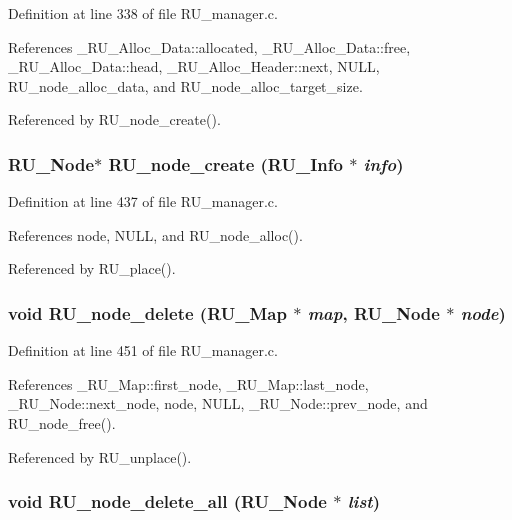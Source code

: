 Definition at line 338 of file RU\_\-manager.c.

References \_\-RU\_\-Alloc\_\-Data::allocated, \_\-RU\_\-Alloc\_\-Data::free, \_\-RU\_\-Alloc\_\-Data::head, \_\-RU\_\-Alloc\_\-Header::next, NULL, RU\_\-node\_\-alloc\_\-data, and RU\_\-node\_\-alloc\_\-target\_\-size.

Referenced by RU\_\-node\_\-create().
\subsubsection{\setlength{\rightskip}{0pt plus 5cm}\bf{RU\_\-Node}$\ast$ RU\_\-node\_\-create (\bf{RU\_\-Info} $\ast$ {\em info})}\label{RU__manager_8c_a315764809eb265c289f574a6e007dea}




Definition at line 437 of file RU\_\-manager.c.

References node, NULL, and RU\_\-node\_\-alloc().

Referenced by RU\_\-place().
\subsubsection{\setlength{\rightskip}{0pt plus 5cm}void RU\_\-node\_\-delete (\bf{RU\_\-Map} $\ast$ {\em map}, \bf{RU\_\-Node} $\ast$ {\em node})}\label{RU__manager_8c_c88c4d3a796e4c8b83832f18e219e084}




Definition at line 451 of file RU\_\-manager.c.

References \_\-RU\_\-Map::first\_\-node, \_\-RU\_\-Map::last\_\-node, \_\-RU\_\-Node::next\_\-node, node, NULL, \_\-RU\_\-Node::prev\_\-node, and RU\_\-node\_\-free().

Referenced by RU\_\-unplace().
\subsubsection{\setlength{\rightskip}{0pt plus 5cm}void RU\_\-node\_\-delete\_\-all (\bf{RU\_\-Node} $\ast$ {\em list})}\label{RU__manager_8c_8f707464bf5da98622a5bad82a0f42ae}





